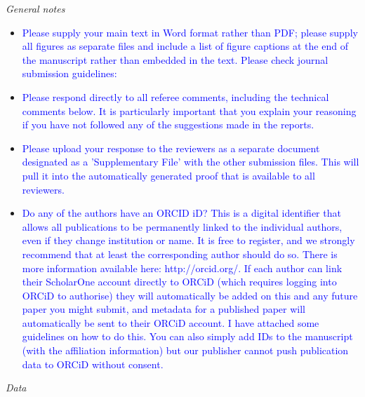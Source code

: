 \documentclass[12pt,letterpaper]{article}
\renewcommand{\subsection}[1]{%
\bigskip
\begin{center}
\begin{large}
\normalfont\itshape #1
\end{large}
\end{center}}
\begin{document}
\subsection{General notes}
\begin{itemize}
\item{\textcolor{blue}{Please supply your main text in Word format rather than PDF; please supply all figures as separate files and include a list of figure captions at the end of the manuscript rather than embedded in the text. Please check journal submission guidelines:}}

\item{\textcolor{blue}{Please respond directly to all referee comments, including the technical comments below. It is particularly important that you explain your reasoning if you have not followed any of the suggestions made in the reports.}}

\item{\textcolor{blue}{Please upload your response to the reviewers as a separate document designated as a 'Supplementary File' with the other submission files. This will pull it into the automatically generated proof that is available to all reviewers.}}

\item{\textcolor{blue}{Do any of the authors have an ORCID iD? This is a digital identifier that allows all publications to be permanently linked to the individual authors, even if they change institution or name. It is free to register, and we strongly recommend that at least the corresponding author should do so. There is more information available here: http://orcid.org/. If each author can link their ScholarOne account directly to ORCiD (which requires logging into ORCiD to authorise) they will automatically be added on this and any future paper you might submit, and metadata for a published paper will automatically be sent to their ORCiD account. I have attached some guidelines on how to do this. You can also simply add IDs to the manuscript (with the affiliation information) but our publisher cannot push publication data to ORCiD without consent.}}

\end{itemize}

\subsection{Data}
\end{document}
